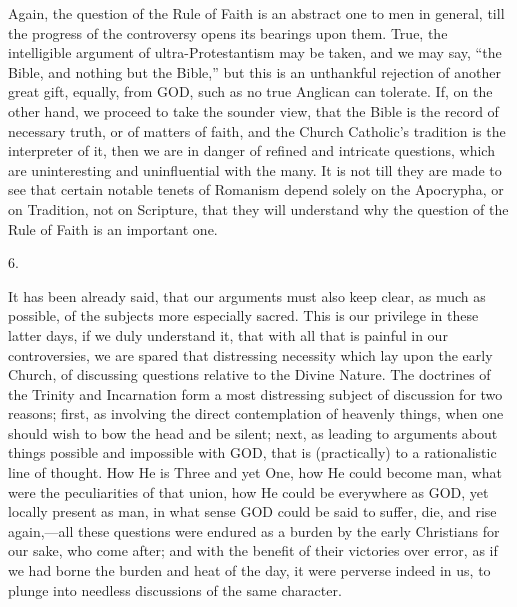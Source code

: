 Again, the question of the Rule of Faith is an
abstract one to men in general, till the progress of the controversy
opens its bearings upon them. True, the intelligible argument of
ultra-Protestantism may be taken, and we may say, ``the Bible, and
nothing but the Bible,'' but this is an unthankful rejection of another
great gift, equally, from GOD,
such as no true Anglican can tolerate. If, on the other hand, we
proceed to take the sounder view, that the Bible is the record of
necessary truth, or of matters of faith, and the Church Catholic's
tradition is the interpreter of it, then we are in danger of refined
and intricate questions, which are uninteresting and uninfluential
with the many. It is not till they are made to see that certain
notable tenets of Romanism depend solely on the Apocrypha, or on
Tradition, not on Scripture, that they will understand why the
question of the Rule of Faith is an important one.

6.

It has been already said, that our arguments must
also keep clear, as much as possible, of the subjects more especially
sacred. This is our privilege in these latter days, if we duly
understand it, that with all that is painful in our controversies, we
are spared that distressing necessity which lay upon the early Church,
of discussing questions relative to the Divine Nature. The doctrines
of the Trinity and Incarnation form a most distressing subject of
discussion for two reasons; first, as involving the direct contemplation of heavenly things, when one should wish to bow the head
and be silent; next, as leading to arguments about things possible and
impossible with GOD, that
is (practically) to a rationalistic line of thought. How He is Three
and yet One, how He could become man, what were the peculiarities of
that union, how He could be everywhere as GOD,
yet locally present as man, in what sense GOD
could be said to suffer, die, and rise again,—all these questions
were endured as a burden by the early Christians for our sake, who
come after; and with the benefit of their victories over error, as if
we had borne the burden and heat of the day, it were perverse indeed
in us, to plunge into needless discussions of the same character.

